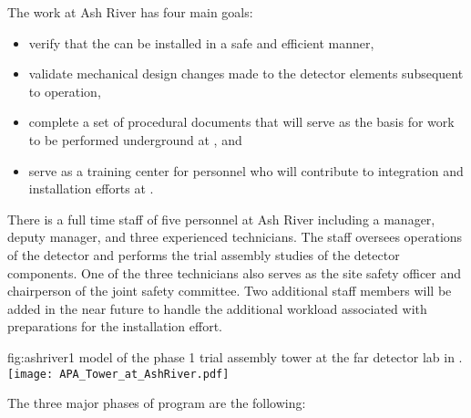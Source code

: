 The work at Ash River has four main goals:
\begin{itemize}
  \item verify that the   can be installed 
    in a safe and efficient manner,
  \item validate mechanical design changes made to the detector
    elements subsequent to  operation,
  \item complete a set of procedural documents that will serve 
    as the basis for work to be performed underground at 
    , and 
  \item serve as a training center for personnel who will 
    contribute to  integration and installation 
    efforts at .
\end{itemize}

There is a full time staff of five personnel at Ash River including
a manager, deputy manager, and three experienced technicians.  The 
staff oversees operations of the  detector and performs 
the trial assembly studies of the  detector components.  
One of the three technicians also serves as the site safety officer 
and chairperson of the joint safety committee.  Two additional staff
members will be added in the near future to handle the additional 
workload associated with preparations for the  
installation effort.  

\begin{dunefigure}{fig:ashriver1}
  {\threed  model of the phase 1 trial assembly  tower at the  far detector lab in .}
  \texttt{[image: APA\_Tower\_at\_AshRiver.pdf]}
\end{dunefigure}

The three major phases of  program are the following:

